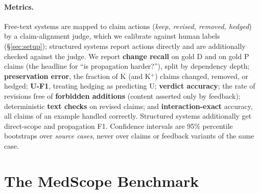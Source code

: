 \documentclass[11pt]{article}
\newcommand{\D}{\textsc{D}}
\newcommand{\Pp}{\textsc{P}}
\newcommand{\K}{\textsc{K}}
\newcommand{\U}{\textsc{U}}
\newcommand{\ms}{MedScope}
\begin{document}
\paragraph{Metrics.} Free-text systems are mapped to claim actions (\emph{keep, revised, removed, hedged}) by a claim-alignment judge, which we calibrate against human labels (\S\ref{sec:setup}); structured systems report actions directly and are additionally checked against the judge. We report \textbf{change recall} on gold \D{} and on gold \Pp{} claims (the headline for ``is propagation harder?''), split by dependency depth; \textbf{preservation error}, the fraction of \K{} (and \K$^{+}$) claims changed, removed, or hedged; \textbf{\U-F1}, treating hedging as predicting \U{}; \textbf{verdict accuracy}; the rate of revisions free of \textbf{forbidden additions} (content asserted only by feedback); deterministic \textbf{text checks} on revised claims; and \textbf{interaction-exact} accuracy, all claims of an example handled correctly. Structured systems additionally get direct-scope and propagation F1. Confidence intervals are 95\% percentile bootstraps over \emph{source cases}, never over claims or feedback variants of the same case.

\section{The \ms{} Benchmark}
\label{sec:data}
\end{document}
